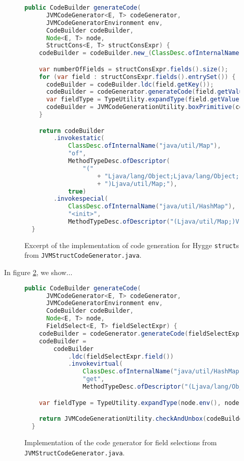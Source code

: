 \begin{figure}[H]
  \centering
  \begin{lstlisting}[language=Java]
  public CodeBuilder generateCode(
      JVMCodeGenerator<E, T> codeGenerator,
      JVMCodeGeneratorEnvironment env,
      CodeBuilder codeBuilder,
      Node<E, T> node,
      StructCons<E, T> structConsExpr) {
    codeBuilder = codeBuilder.new_(ClassDesc.ofInternalName("java/util/HashMap")).dup();

    var numberOfFields = structConsExpr.fields().size();
    for (var field : structConsExpr.fields().entrySet()) {
      codeBuilder = codeBuilder.ldc(field.getKey());
      codeBuilder = codeGenerator.generateCode(field.getValue(), env, codeBuilder);
      var fieldType = TypeUtility.expandType(field.getValue().env(), field.getValue().type());
      codeBuilder = JVMCodeGenerationUtility.boxPrimitive(codeBuilder, fieldType);
    }

    return codeBuilder
        .invokestatic(
            ClassDesc.ofInternalName("java/util/Map"),
            "of",
            MethodTypeDesc.ofDescriptor(
                "("
                    + "Ljava/lang/Object;Ljava/lang/Object;".repeat(numberOfFields)
                    + ")Ljava/util/Map;"),
            true)
        .invokespecial(
            ClassDesc.ofInternalName("java/util/HashMap"),
            "<init>",
            MethodTypeDesc.ofDescriptor("(Ljava/util/Map;)V"));
  }
  \end{lstlisting}
  \caption{Excerpt of the implementation of code generation for Hygge \texttt{struct}s from \texttt{JVMStructCodeGenerator.java}.}
  \label{fig:jvm_struct_builder}
\end{figure}

In figure \ref{fig:jvm_constructor_builder}, we show...

\begin{figure}
    \centering
    \begin{lstlisting}[language=Java]
  public CodeBuilder generateCode(
      JVMCodeGenerator<E, T> codeGenerator,
      JVMCodeGeneratorEnvironment env,
      CodeBuilder codeBuilder,
      Node<E, T> node,
      FieldSelect<E, T> fieldSelectExpr) {
    codeBuilder = codeGenerator.generateCode(fieldSelectExpr.target(), env, codeBuilder);
    codeBuilder =
        codeBuilder
            .ldc(fieldSelectExpr.field())
            .invokevirtual(
                ClassDesc.ofInternalName("java/util/HashMap"),
                "get",
                MethodTypeDesc.ofDescriptor("(Ljava/lang/Object;)Ljava/lang/Object;"));

    var fieldType = TypeUtility.expandType(node.env(), node.type());

    return JVMCodeGenerationUtility.checkAndUnbox(codeBuilder, fieldType);
  }
    \end{lstlisting}
    \caption{Implementation of the code generator for field selections from \texttt{JVMStructCodeGenerator.java}.}
    \label{fig:jvm_constructor_builder}
\end{figure}
